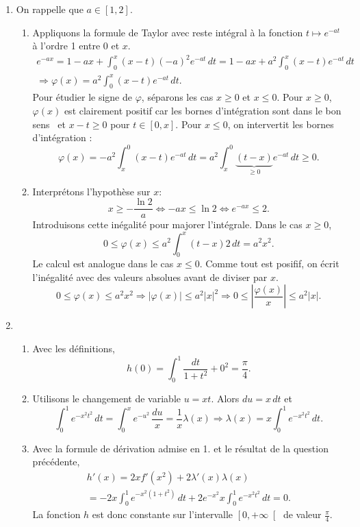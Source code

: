 \begin{enumerate}
 \item On rappelle que $a \in \left[ 1,2 \right]$. 
\begin{enumerate}
 \item Appliquons la formule de Taylor avec reste intégral à la fonction $t \mapsto e^{-at}$ à l'ordre 1 entre $0$ et $x$.
\begin{multline*}
 e^{-ax} = 1 - a x + \int_{0}^{x}(x - t)(-a)^2 e^{-at}\, dt
 = 1 - a x + a^2\int_{0}^{x}(x - t) e^{-at}\, dt \\
\Rightarrow \varphi(x) = a^2\int_{0}^{x}(x - t) e^{-at}\, dt. 
\end{multline*}
Pour étudier le signe de $\varphi$, séparons les cas $x\geq 0$ et $x \leq 0$.\newline
Pour $x\geq 0$, $\varphi(x)$ est clairement positif car les bornes d'intégration sont dans le \og bon sens\fg~ et $x-t\geq 0$ pour $t\in \left[ 0, x\right]$.\newline
Pour $x\leq 0$, on intervertit les bornes d'intégration : 
\[
 \varphi(x) = -a^2\int_{x}^0(x-t)e^{-at}\,dt = a^2\int_{x}^0\underset{\geq 0 }{\underbrace{(t-x)}}e^{-at}\,dt \geq 0.
\]
 \item  Interprétons l'hypothèse sur $x$:
\[
 x \geq -\frac{\ln 2}{a} \Leftrightarrow -ax \leq \ln 2 \Leftrightarrow e^{-ax} \leq 2.
\]
Introduisons cette inégalité pour majorer l'intégrale. Dans le cas $x\geq 0$,
\[
 0 \leq \varphi(x) \leq a^2 \int_0^x(t-x) 2 \,dt = a^2 x^2.
\]
Le calcul est analogue dans le cas $x\leq 0$. Comme tout est posifif, on écrit l'inégalité avec des valeurs absolues avant de diviser par $x$.
\[
 0 \leq \varphi(x) \leq a^2x^2 \Rightarrow \left| \varphi(x) \right| \leq a^2 |x|^2
 \Rightarrow 0 \leq \left|\frac{\varphi(x)}{x} \right| \leq a^2 |x|.
\]
\end{enumerate}

 \item 
\begin{enumerate}
 \item Avec les définitions,
\[
 h(0) = \int_0^1 \frac{dt}{1+t^2} + 0^2 = \frac{\pi}{4}.
\]

 \item Utilisons le changement de variable $u = xt$. Alors $du = x\,dt$ et
\[
 \int_{0}^{1}e^{-x^2t^2}\,dt = \int_{0}^{x} e^{-u^2}\,\frac{du}{x} = \frac{1}{x}\lambda(x) 
 \Rightarrow \lambda(x) = x \int_{0}^{1}e^{-x^2t^2}\,dt.
\]

 \item Avec la formule de dérivation admise en 1. et le résultat de la question précédente,
\begin{multline*}
 h'(x) = 2xf'(x^2) + 2\lambda'(x) \lambda(x)\\
 = - 2x\int_{0}^{1}e^{-x^2(1+t^2)}\,dt + 2 e^{-x^2} x \int_{0}^{1}e^{-x^2t^2}\,dt
 = 0 .
\end{multline*}
La fonction $h$ est donc constante sur l'intervalle $\left[ 0, +\infty\right[$ de valeur $\frac{\pi}{4}$. 


\end{enumerate}
\end{enumerate}
